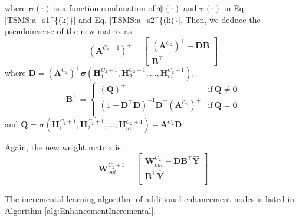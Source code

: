 \documentclass[lettersize,journal]{IEEEtran}
\begin{document}
where $\bm{\sigma}(\cdot)$ is a function combination of $\bm{\psi}(\cdot)$ and $\bm{\tau}(\cdot)$ in Eq. \eqref{TSMS:a_s1^{(k)}} and Eq. \eqref{TSMS:a_s2^{(k)}}. Then, we deduce the pseudoinverse of the new matrix as
\begin{equation}
    \label{incre_pi}
    (\bm{A}^{C_2+1})^{+}=\begin{bmatrix}
    (\bm{A}^{C_2})^{+}-\bm{DB}\\
    \bm{B}^{\top}
    \end{bmatrix}
\end{equation}
where $\bm{D}=(\bm{A}^{C_2})^{+}\bm{\sigma}(\bm{H}_{1}^{C_2+1},\bm{H}_{2}^{C_2+1},...,\bm{H}_{m}^{C_2+1})$,
\begin{equation}
    \label{incre:BT}
    \bm{B}^{\top}=
    \begin{cases}
    (\bm{Q})^{+} &{\text{if}\ \bm{Q} \ne \bm{0}}\\
    (1+\bm{D}^{\top}\bm{D})^{-1}\bm{D}^{\top}(\bm{A}^{C_2})^{+} &{\text{if}\ \bm{Q}=\bm{0}}\\
    \end{cases}
\end{equation}
and $\bm{Q}=\bm{\sigma}(\bm{H}_{1}^{C_2+1},\bm{H}_{2}^{C_2+1},...,\bm{H}_{m}^{C_2+1})-\bm{A}^{C_2} \bm{D}$

Again, the new weight matrix is 
\begin{equation}
    \label{incre:W_out}
    \bm{W}_{out}^{C_2+1}=
    \begin{bmatrix}
    \bm{W}_{out}^{C_2}-\bm{DB}^{\top}\hat{\bm{Y}}\\
    \bm{B}^{\top}\hat{\bm{Y}}\\
    \end{bmatrix}
\end{equation}

The incremental learning algorithm of additional enhancement nodes is listed in Algorithm \ref{alg:EnhancementIncremental}.
\end{document}

